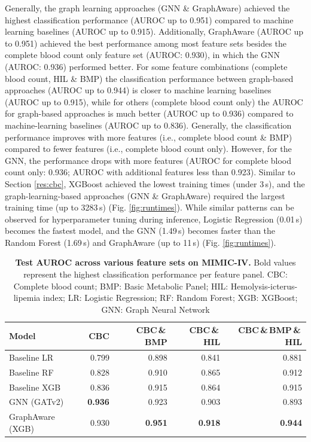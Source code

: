 \documentclass[pdflatex,sn-mathphys-num,lineno]{sn-jnl}
\theoremstyle{thmstyleone}%
\theoremstyle{thmstyletwo}%
\theoremstyle{thmstylethree}%
\begin{document}
Generally, the graph learning approaches (GNN \& GraphAware) achieved the highest classification performance (AUROC up to 0.951) compared to machine learning baselines (AUROC up to 0.915). Additionally, GraphAware  (AUROC up to 0.951) achieved the best performance among most feature sets besides the complete blood count only feature set (AUROC: 0.930), in which the GNN (AUROC: 0.936) performed better. For some feature combinations (complete blood count, HIL \& BMP) the classification performance between graph-based approaches (AUROC up to 0.944) is closer to machine learning baselines (AUROC up to 0.915), while for others (complete blood count only) the AUROC for graph-based approaches is much better (AUROC up to 0.936) compared to machine-learning baselines  (AUROC up to 0.836). Generally, the classification performance improves with more features (i.e., complete blood count \& BMP) compared to fewer features (i.e., complete blood count only). However, for the GNN, the performance drops with more features (AUROC for complete blood count only: 0.936; AUROC with additional features less than 0.923).
Similar to Section \ref{res:cbc}, XGBoost achieved the lowest training times (under 3\,s), and the graph-learning-based approaches (GNN \& GraphAware) required the largest training time (up to 3283\,s) (Fig. \ref{fig:runtimes}). While similar patterns can be observed for hyperparameter tuning during inference, Logistic Regression (0.01\,s) becomes the fastest model, and the GNN (1.49\,s) becomes faster than the Random Forest (1.69\,s) and GraphAware (up to 11\,s) (Fig. \ref{fig:runtimes}).

  \begin{table}[htbp]
    \centering
    \small
    \caption{\textbf{Test AUROC across various feature sets on MIMIC-IV.} Bold values represent the highest classification performance per feature panel. CBC: Complete blood count; BMP: Basic Metabolic Panel; HIL: Hemolysis-icterus-lipemia index; LR: Logistic Regression; RF: Random Forest; XGB: XGBoost; GNN: Graph Neural Network}
    \label{tab:featureset_auroc_mimic}
    \begin{tabular}{lrrrr}
        \toprule
        \textbf{Model} & \textbf{CBC} & \textbf{CBC\,\&\,BMP} & \textbf{CBC\,\&\,HIL} & \textbf{CBC\,\&\,BMP\,\&\,HIL} \\
        \midrule
        Baseline LR & 0.799 & 0.898 & 0.841 & 0.881 \\
        Baseline RF       & 0.828 & 0.910 & 0.865 & 0.912 \\
        Baseline XGB              & 0.836 & 0.915 & 0.864 & 0.915 \\
        GNN (GATv2)                  & \textbf{0.936} & 0.923 & 0.903 & 0.893 \\
        GraphAware (XGB)         & 0.930 & \textbf{0.951} & \textbf{0.918} & \textbf{0.944} \\
        \bottomrule
    \end{tabular}
\end{table}
\end{document}
